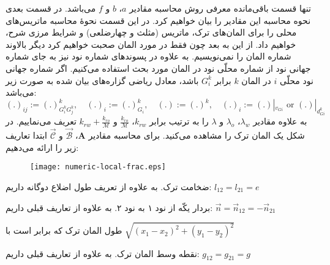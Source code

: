 تنها قسمت باقی‌مانده معرفی روش محاسبه مقادیر
 $a$، $b$ و $f$ 
می‌باشد. در قسمت بعدی نحوه محاسبه این مقادیر را بیان خواهیم کرد.
\label{ch:36}
در این قسمت نحوهٔ محاسبه ماتریس‌های محلی را برای المان‌های ترک، ماتریس (مثلث و چهارضلعی) و شرایط مرزی شرح، خواهیم داد. از این به بعد چون فقط در مورد المان صحبت خواهیم کرد دیگر بالاوند شماره المان را نمی‌نویسیم. به علاوه در پسوند‌های شماره نود نیز به جای شماره جهانی نود از شماره محلّی نود در المان مورد بحث استفاده می‌کنیم. اگر شماره جهانی نود محلّی $i$ در المان $k$ برابر $G_i^k$ باشد، معادل ریاضی گزاره‌های بیان شده به صورت زیر می‌باشد:
\begin{equation*}
(.)_{ij} := (.)^k_{{G_{i}^k}{G_{j}^k}}, \quad  (.)_i:=(.)_{G_i}^k, \quad
(.) := (.)^k,  \quad (.)_i := (.)|_{v_{Gi}}\text{ or }(.)|_{d_{Gi}^k} 
\end{equation*}
به علاوه مقادیر
$\lambda_w$، $\lambda_o$ و $\lambda$ 
را به ترتیب برابر 
$k_{rw}$، $\frac{k_{ro}}{\mathcal M}$ و $k_{rw}+\frac{k_{ro}}{\mathcal M}$ 
تعریف می‌نماییم.
در شکل  یک المان ترک را مشاهده می‌کنید. برای محاسبه مقادیر 
$\mathbf{A}$، $\vec{\mathcal B}$ و $\vec{\mathcal C}$
ابتدا تعاریف زیر را ارائه می‌دهیم:
\begin{figure}[h]
\texttt{[image: numeric-local-frac.eps]} 
\label{fig:3frac}
\end{figure}

\begin{tight_itemize}
\item[$e$]
ضخامت ترک. به علاوه از تعریف طول اضلاع دوگانه داریم: $l_{12} = l_{21} = e$
\item[$\vec n$]
بردار یکّه از نود ۱ به نود ۲. به علاوه از تعاریف قبلی داریم:
$\vec n = \vec n_{12} = -\vec n_{21}$ 
\item[$l$]
طول المان ترک که برابر است با
$\sqrt{ \left( x_1 - x_2 \right)^2 + \left( y_1 - y_2 \right)^2 } $
\item[$g$]
نقطه وسط المان ترک. به علاوه از تعاریف قبلی داریم:  
$g_{12} = g_{21} = g$
\end{tight_itemize}

